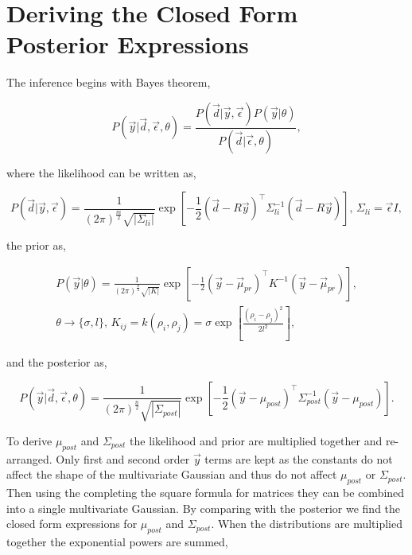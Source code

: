\chapter{Deriving the Closed Form Posterior Expressions}
\label{append:dervcf}
The inference begins with Bayes theorem,  

\begin{equation}    
    P(\vec{y}|\vec{d}, \vec\epsilon, \theta) = \frac{P(\vec{d}|\vec{y},\vec\epsilon)P(\vec{y}|\theta)}{P(\vec d|\vec\epsilon,\theta)},
\end{equation}

\noindent where the likelihood can be written as,

\begin{equation}
P(\vec{d}|\vec{y},\vec\epsilon) = \frac{1}{(2\pi)^{\frac{m}{2}} \sqrt{|\Sigma_{li}|}} \exp \left[ -\frac{1}{2} (\vec d - R\vec y)^{\top} \Sigma^{-1}_{li} (\vec d - R\vec y) \right], \, \Sigma_{li} = \vec \epsilon I,
\end{equation}

\noindent the prior as,

\begin{equation}
\begin{split}
P(\vec y|\theta) = \frac{1}{(2\pi)^{\frac{n}{2}} \sqrt{|K|}} \exp \left[ -\frac{1}{2}(\vec y - \vec \mu_{pr})^{\top} K^{-1} (\vec y - \vec \mu_{pr}) \right],\\
\theta \rightarrow \{\sigma, l\}, \, K_{ij} = k(\rho_i, \rho_j) = \sigma \exp \left[\frac{(\rho_i - \rho_j)^2}{2l^2}\right],
\end{split}
\end{equation}

\noindent and the posterior as,

\begin{equation}
P(\vec{y}|\vec{d},\vec\epsilon, \theta) = \frac{1}{(2\pi)^{\frac{n}{2}} \sqrt{|\Sigma_{post}|}} \exp \left[ -\frac{1}{2}(\vec y - \mu_{post})^{\top} \Sigma^{-1}_{post} (\vec y - \mu_{post}) \right].
\end{equation}

\noindent To derive $\mu_{post}$ and $\Sigma_{post}$ the likelihood and prior are multiplied together and re-arranged. Only first and second order $\vec y$ terms are kept as the constants do not affect the shape of the multivariate Gaussian and thus do not affect $\mu_{post}$ or $\Sigma_{post}$. Then using the completing the square formula for matrices they can be combined into a single multivariate Gaussian. By comparing with the posterior we find the closed form expressions for $\mu_{post}$ and $\Sigma_{post}$. When the distributions are multiplied together the exponential powers are summed,

